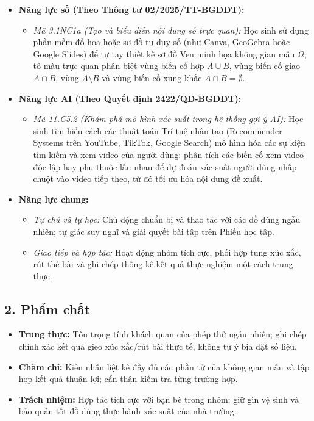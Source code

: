 \documentclass[12pt, a4paper]{article}
\begin{document}
\begin{itemize}[leftmargin=1.2cm]
    \item \textbf{Năng lực số (Theo Thông tư 02/2025/TT-BGDĐT):}
    \begin{itemize}[leftmargin=0.6cm]
        \item \textit{Mã 3.1NC1a (Tạo và biểu diễn nội dung số trực quan):} Học sinh sử dụng phần mềm đồ họa hoặc sơ đồ tư duy số (như Canva, GeoGebra hoặc Google Slides) để tự tay thiết kế sơ đồ Ven minh họa không gian mẫu $\Omega$, tô màu trực quan phân biệt vùng biến cố hợp $A \cup B$, vùng biến cố giao $A \cap B$, vùng $A \setminus B$ và vùng biến cố xung khắc $A \cap B = \emptyset$.
    \end{itemize}

    \item \textbf{Năng lực AI (Theo Quyết định 2422/QĐ-BGDĐT):}
    \begin{itemize}[leftmargin=0.6cm]
        \item \textit{Mã 11.C5.2 (Khám phá mô hình xác suất trong hệ thống gợi ý AI):} Học sinh tìm hiểu cách các thuật toán Trí tuệ nhân tạo (Recommender Systems trên YouTube, TikTok, Google Search) mô hình hóa các sự kiện tìm kiếm và xem video của người dùng: phân tích các biến cố xem video độc lập hay phụ thuộc lẫn nhau để dự đoán xác suất người dùng nhấp chuột vào video tiếp theo, từ đó tối ưu hóa nội dung đề xuất.
    \end{itemize}

    \item \textbf{Năng lực chung:}
    \begin{itemize}[leftmargin=0.6cm]
        \item \textit{Tự chủ và tự học:} Chủ động chuẩn bị và thao tác với các đồ dùng ngẫu nhiên; tự giác suy nghĩ và giải quyết bài tập trên Phiếu học tập.
        \item \textit{Giao tiếp và hợp tác:} Hoạt động nhóm tích cực, phối hợp tung xúc xắc, rút thẻ bài và ghi chép thống kê kết quả thực nghiệm một cách trung thực.
    \end{itemize}
\end{itemize}

\subsection*{2. Phẩm chất}

\begin{itemize}[leftmargin=1.2cm]
    \item \textbf{Trung thực:} Tôn trọng tính khách quan của phép thử ngẫu nhiên; ghi chép chính xác kết quả gieo xúc xắc/rút bài thực tế, không tự ý bịa đặt số liệu.
    \item \textbf{Chăm chỉ:} Kiên nhẫn liệt kê đầy đủ các phần tử của không gian mẫu và tập hợp kết quả thuận lợi; cẩn thận kiểm tra từng trường hợp.
    \item \textbf{Trách nhiệm:} Hợp tác tích cực với bạn bè trong nhóm; giữ gìn vệ sinh và bảo quản tốt đồ dùng thực hành xác suất của nhà trường.
\end{itemize}
\end{document}
